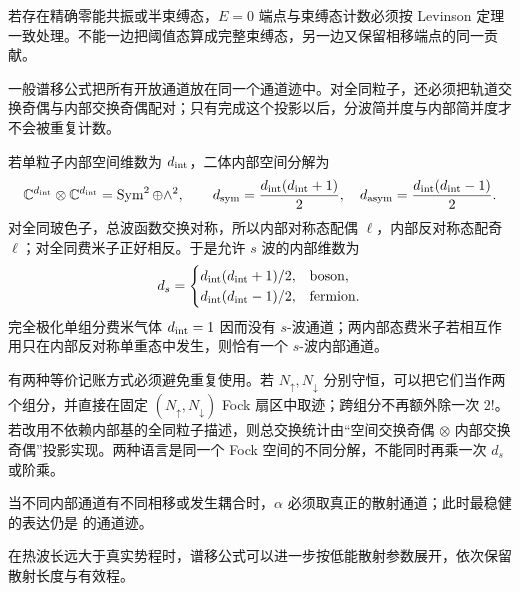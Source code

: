 若存在精确零能共振或半束缚态，\(E=0\) 端点与束缚态计数必须按 Levinson 定理一致处理。不能一边把阈值态算成完整束缚态，另一边又保留相移端点的同一贡献。

一般谱移公式把所有开放通道放在同一个通道迹中。对全同粒子，还必须把轨道交换奇偶与内部交换奇偶配对；只有完成这个投影以后，分波简并度与内部简并度才不会被重复计数。

若单粒子内部空间维数为 \(d_{\rm int}\)，二体内部空间分解为
\begin{equation}
 \mathbb C^{d_{\rm int}}\otimes\mathbb C^{d_{\rm int}}
 =\operatorname{Sym}^2\oplus\wedge^2,
 \qquad
 d_{\rm sym}=\frac{d_{\rm int}(d_{\rm int}+1)}2,
 \quad
 d_{\rm asym}=\frac{d_{\rm int}(d_{\rm int}-1)}2.
 \label{eq:phys-sm-internal-symmetry-dimensions}
\end{equation}
对全同玻色子，总波函数交换对称，所以内部对称态配偶 \(\ell\)，内部反对称态配奇 \(\ell\)；对全同费米子正好相反。于是允许 \(s\) 波的内部维数为
\begin{equation}
 d_s=
 \begin{cases}
 d_{\rm int}(d_{\rm int}+1)/2,&\text{boson},\\
 d_{\rm int}(d_{\rm int}-1)/2,&\text{fermion}.
 \end{cases}
 \label{eq:phys-sm-s-wave-channel-degeneracy}
\end{equation}
完全极化单组分费米气体 \(d_{\rm int}=1\) 因而没有 \(s\)-波通道；两内部态费米子若相互作用只在内部反对称单重态中发生，则恰有一个 \(s\)-波内部通道。

有两种等价记账方式必须避免重复使用。若 \(N_\uparrow,N_\downarrow\) 分别守恒，可以把它们当作两个组分，并直接在固定 \((N_\uparrow,N_\downarrow)\) Fock 扇区中取迹；跨组分不再额外除一次 \(2!\)。若改用不依赖内部基的全同粒子描述，则总交换统计由“空间交换奇偶 \(\otimes\) 内部交换奇偶”投影实现。两种语言是同一个 Fock 空间的不同分解，不能同时再乘一次 \(d_s\) 或阶乘。

当不同内部通道有不同相移或发生耦合时，\(\alpha\) 必须取真正的散射通道；此时最稳健的表达仍是 的通道迹。

在热波长远大于真实势程时，谱移公式可以进一步按低能散射参数展开，依次保留散射长度与有效程。


